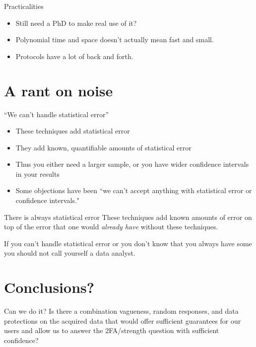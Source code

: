 \documentclass[xcolor={dvipsnames,table,hyperref}]{beamer}
\begin{document}
\begin{frame}{Practicalities}
  \begin{itemize}
    \item Still need a PhD to make real use of it?
    \item Polynomial time and space doesn't actually mean fast and small.
    \item Protocols have a lot of back and forth.
  \end{itemize}
\end{frame}

\section{A rant on noise}

\begin{frame}{“We can't handle statistical error”}
  \begin{itemize}
    \item These techniques add statistical error
    \item They add known, quantifiable amounts of statistical error
    \item Thus you either need a larger sample, or you have wider confidence intervals in your results
    \item Some objections have been “we can't accept anything with statistical error or confidence intervals."
  \end{itemize}

\end{frame}

\begin{frame}{There is always statistical error}
  These techniques add known amounts of error on top of the error that one would \emph{already have} without these techniques.
\end{frame}

\begin{frame}[standout]
  If you can't handle statistical error or you don't know that you always have some you should not call yourself a data analyst.
\end{frame}

\section{Conclusions?}

\begin{frame}{Can we do it?}
  Is there a combination vagueness, random responses, and data protections on the acquired data
  that would offer sufficient guarantees for our users
  and allow us to answer the 2FA/strength question with sufficient confidence?
\end{frame}
\end{document}
